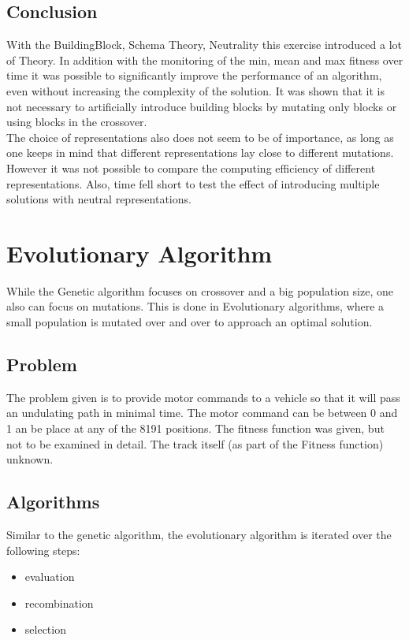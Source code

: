 \documentclass{scrartcl}
\begin{document}
\subsection{Conclusion}
With the BuildingBlock, Schema Theory, Neutrality this exercise introduced a lot of Theory. In addition with the monitoring of the min, mean and max fitness over time it was possible to significantly improve the performance of an algorithm, even without increasing the complexity of the solution. It was shown that it is not necessary to artificially introduce building blocks by mutating only blocks or using blocks in the crossover.\\
The choice of representations also does not seem to be of importance, as long as one keeps in mind that different representations lay close to different mutations. However it was not possible to compare the computing efficiency of different representations. Also, time fell short to test the effect of introducing multiple solutions with neutral representations.




\section{Evolutionary Algorithm}
While the Genetic algorithm focuses on crossover and a big population size, one also can focus on mutations. This is done in Evolutionary algorithms, where a small population is mutated over and over to approach an optimal solution.

\subsection{Problem}
The problem given is to provide motor commands to a vehicle so that it will pass an undulating path in minimal time. The motor command can be between 0 and 1 an be place at any of the 8191 positions. The fitness function was given, but not to be examined in detail. The track itself (as part of the Fitness function) unknown.

\subsection{Algorithms}
Similar to the genetic algorithm, the evolutionary algorithm is iterated over the following steps:

\begin{itemize}
\item evaluation
\item recombination
\item selection
\end{itemize}
\end{document}
